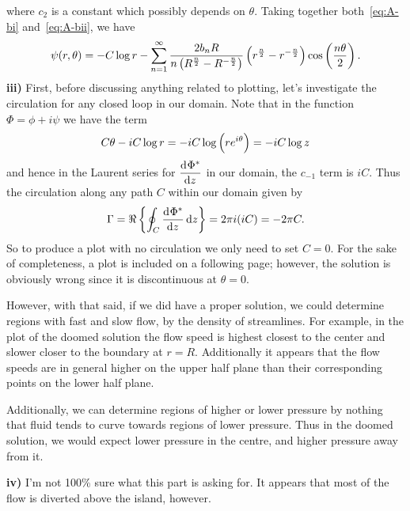 \documentclass{article}
\begin{document}
%
where $c_2$ is a constant which possibly depends on $\theta$. Taking
together both~\eqref{eq:A-bi} and~\eqref{eq:A-bii}, we have
%
\begin{equation*}
    \psi(r, \theta)
        = - C \log r - \sum_{n = 1}^\infty
            \frac{2 b_n R}{n \del{R^{\frac{n}{2}} - R^{- \frac{n}{2}}}} \del{r^{\frac{n}{2}} - r^{- \frac{n}{2}}}
        \cos \del{\frac{n \theta}{2}}
        .
\end{equation*}
%
\textbf{iii)} First, before discussing anything related to plotting,
let's investigate the circulation for any closed loop in our domain.
Note that in the function $\Phi = \phi + i \psi$ we have the term
%
\begin{equation*}
    C \theta - i C \log r = - i C \log \del{r e^{i \theta}} = - i C \log z
\end{equation*}
%
and hence in the Laurent series for $\dod{\Phi^*}{z}$ in our domain, the $c_{-1}$ term
is $i C$. Thus the circulation along any path $C$ within our domain given by
%
\begin{equation*}
    \Gamma = \Re \cbr{ \oint_C \dod{\Phi^*}{z} \dif z } = 2 \pi i (i C) = - 2 \pi C
    .
\end{equation*}
%
So to produce a plot with no circulation we only need to set $C = 0$.
For the sake of completeness, a plot is included on a following page;
however, the solution is obviously wrong since it is discontinuous at
$\theta = 0$.

However, with that said, if we did have a proper solution, we could
determine regions with fast and slow flow, by the density of
streamlines. For example, in the plot of the doomed solution the flow
speed is highest closest to the center and slower closer to the boundary
at $r = R$. Additionally it appears that the flow speeds are in general
higher on the upper half plane than their corresponding points on the
lower half plane.

Additionally, we can determine regions of higher or lower pressure by
nothing that fluid tends to curve towards regions of lower pressure.
Thus in the doomed solution, we would expect lower pressure in the
centre, and higher pressure away from it.

\textbf{iv)} I'm not 100\% sure what this part is asking for. It appears
that most of the flow is diverted above the island, however.

\newpage
\end{document}
